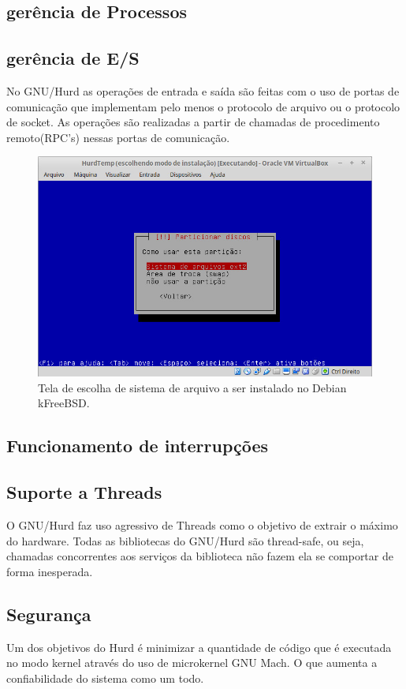 \documentclass[conference]{IEEEtran}
\begin{document}
\subsection{gerência de Processos}\label{sec:HURDPROC}

\subsection{gerência de E/S}\label{sec:HurdES}
No GNU/Hurd as operações de entrada e saída são feitas com o uso de portas de comunicação que implementam pelo menos o protocolo de arquivo ou o protocolo de socket. As operações são realizadas a partir de chamadas de procedimento remoto(RPC's) nessas portas de comunicação\cite{HurdIO}.

\begin{figure}[h!]
	\centering
	\includegraphics[scale=0.35]{SistemasArquivosHurd.jpeg}
	\caption{Tela de escolha de sistema de arquivo a ser instalado no Debian kFreeBSD.}
	\label{fig:SisAqrLinux}
\end{figure}

\subsection{Funcionamento de interrupções}\label{sec:HurdInt}

\subsection{Suporte a Threads}\label{sec:HurdThreads}
O GNU/Hurd faz uso agressivo de Threads como o objetivo de extrair o máximo do hardware.\cite{Hurd} Todas as bibliotecas do GNU/Hurd são thread-safe, ou seja, chamadas concorrentes aos serviços da biblioteca não fazem ela se comportar de forma inesperada.

\subsection{Segurança}\label{sec:HurdSec}
Um dos objetivos do Hurd é minimizar a quantidade de código que é executada no modo kernel através do uso de microkernel GNU Mach. O que aumenta a confiabilidade do sistema como um todo.



\end{document}
